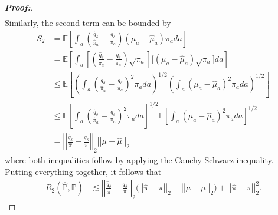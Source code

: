 \documentclass[11pt,twoside]{article}
\theoremstyle{definition}
\theoremstyle{remark}
\begin{document}
\begin{proof}[\textbf{Proof:}]
\begin{align*}
\end{align*}
Similarly, the second term can be bounded by
\begin{align*}
    S_2 &= \mathbb{E} \left[\int_a \left(\frac{\widehat{q}_\delta}{\widehat{\pi}_a} - \frac{q_\delta}{\pi_a} \right) (\mu_a - \widehat{\mu}_a) \pi_a  da\right]\\
    &= \mathbb{E} \left[\int_a \left[\left(\frac{\widehat{q}_\delta}{\widehat{\pi}_a} - \frac{q_\delta}{\pi_a} \right)\sqrt{\pi_a} \right] \Big[(\mu_a - \widehat{\mu}_a) \sqrt{\pi_a} \Big]  da\right]\\
    &\leq \mathbb{E} \left[\left(\int_a \left(\frac{\widehat{q}_\delta}{\widehat{\pi}_a} - \frac{q_\delta}{\pi_a} \right)^2 \pi_a  da \right)^{1/2} \left(\int_a (\mu_a - \widehat{\mu}_a)^2 \pi_a  da \right)^{1/2}\right] \\ 
    &\leq \mathbb{E} \left[\int_a \left(\frac{\widehat{q}_\delta}{\widehat{\pi}_a} - \frac{q_\delta}{\pi_a} \right)^2 \pi_a  da \right]^{1/2} \mathbb{E} \left[ \int_a (\mu_a - \widehat{\mu}_a)^2 \pi_a  da \right]^{1/2} \\
    &= \left| \left|\frac{\widehat{q}_\delta}{\widehat{\pi}} - \frac{q_\delta}{\pi} \right| \right|_2 \left| \left|\mu - \widehat{\mu} \right| \right|_2
\end{align*}
where both inequalities follow by applying the Cauchy-Schwarz inequality. Putting everything together, it follows that
\begin{align*}
    R_2(\widehat{\mathbb{P}}, \mathbb{P}) &\lesssim \left| \left| \frac{\widehat{q}_\delta}{\widehat{\pi}} - \frac{q_\delta}{\pi} \right| \right|_2 \Big( \left| \left| \widehat{\pi} - \pi \right| \right|_2 + \left| \left| \widehat{\mu} - \mu \right| \right|_2\Big) + \left| \left| \widehat{\pi} - \pi \right| \right|^2_2.
\end{align*}
\end{proof}
\end{document}
